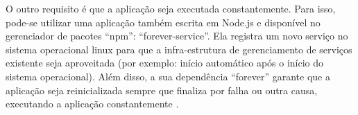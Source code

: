 O outro requisito é que a aplicação seja executada constantemente. Para isso,
pode-se utilizar uma aplicação também escrita em Node.js e disponível no
gerenciador de pacotes ``npm'': ``forever-service''. Ela registra um novo serviço no sistema operacional
linux para que a infra-estrutura de gerenciamento de serviços existente seja
aproveitada (por exemplo: início automático após o início do sistema operacional). Além disso, a sua dependência
``forever'' garante que a aplicação seja reinicializada sempre que finaliza por falha ou outra causa,
executando a aplicação constantemente \cite{forever-service}.
